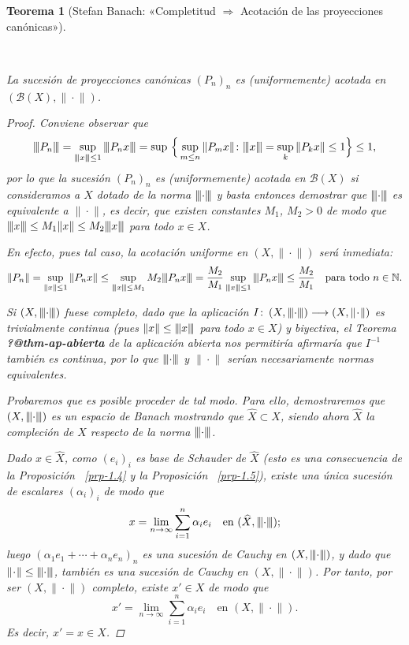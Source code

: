 \documentclass[
  spanish,
  letterpaper,
  DIV=11,
  numbers=noendperiod]{scrreprt}
\newtheorem{theorem}{Teorema}[chapter]
\theoremstyle{definition}
\theoremstyle{remark}
\theoremstyle{definition}
\theoremstyle{exampstyle}
\newcommand{\vertiii}[1]{{\left\vert\kern-0.25ex\left\vert\kern-0.25ex\left\vert #1 
    \right\vert\kern-0.25ex\right\vert\kern-0.25ex\right\vert}}
\newcommand{\vertiii}[1]{{\left\vert\kern-0.25ex\left\vert\kern-0.25ex\left\vert #1 
    \right\vert\kern-0.25ex\right\vert\kern-0.25ex\right\vert}}
\theoremstyle{plain}
\theoremstyle{plain}
\theoremstyle{definition}
\theoremstyle{plain}
\newtheorem{theorem}{Teorema}[chapter]
\theoremstyle{remark}
\begin{document}
\begin{theorem}[Stefan Banach: «Completitud \(\Longrightarrow\)
Acotación de las proyecciones
canónicas»]\protect\hypertarget{thm-banach}{}\label{thm-banach}

~

\hspace*{1mm}

La sucesión de proyecciones canónicas \((P_n)_n\) es (uniformemente)
acotada en \((\mathcal{B}(X),\|\!\cdot\!\|)\).

\begin{proof}
\leavevmode

\hspace*{1cm}

Conviene observar que \[
\vertiii{P_n}=\sup_{\vertiii{x} \leq 1}{\vertiii{P_nx}}=\sup\,\Big\{\sup_{m \leq n}\|P_mx\| \colon \vertiii{x} = \sup_{k}\| P_kx\| \leq 1\Big\} \leq 1,
\] por lo que la sucesión \((P_n)_n\) es (uniformemente) acotada en
\(\mathcal{B}(X)\) si consideramos a \(X\) dotado de la norma
\(\vertiii{\cdot}\) y basta entonces demostrar que \(\vertiii{\cdot}\)
es equivalente a \(\|\!\cdot\!\|\), es decir, que existen constantes
\(M_1\), \(M_2>0\) de modo que
\(\vertiii{x}\leq M_1\|x\|\leq M_2\vertiii{x}\) para todo \(x\in X\).

En efecto, pues tal caso, la acotación uniforme en \((X,\|\!\cdot\!\|)\)
será inmediata: \[
\|P_n\|=\sup_{\|x\|\leq 1}\|P_n x\|\leq\sup_{\vertiii{x}\leq M_1}M_2\vertiii{P_nx}=\dfrac{M_2}{M_1}\sup_{\vertiii{x}\leq 1}\vertiii{P_nx}\leq\dfrac{M_2}{M_1}\quad\text{para todo $n\in\mathbb{N}$}.
\]

Si \(\left(X,\vertiii{\cdot}\right)\) fuese completo, dado que la
aplicación
\(I \colon \left(X, \vertiii{\cdot}\right)\longrightarrow (X, \|\!\cdot\!\|)\)
es trivialmente continua (pues \(\|x\|\leq\vertiii{x}\) para todo
\(x\in X\)) y biyectiva, el Teorema \textbf{?@thm-ap-abierta} de la
aplicación abierta nos permitiría afirmaría que \(I^{-1}\) también es
continua, por lo que \(\vertiii{\cdot}\) y \(\|\!\cdot\!\|\) serían
necesariamente normas equivalentes.

Probaremos que es posible proceder de tal modo. Para ello, demostraremos
que \(\left(X,\vertiii{\cdot}\right)\) es un espacio de Banach mostrando
que \(\widehat{X}\subset X\), siendo ahora \(\widehat{X}\) la compleción
de \(X\) respecto de la norma \(\vertiii{\cdot}\).

Dado \(x\in\widehat{X}\), como \((e_i)_i\) es base de Schauder de
\(\widehat{X}\) (esto es una consecuencia de la Proposición
~\ref{prp-1.4} y la Proposición ~\ref{prp-1.5}), existe una única
sucesión de escalares \((\alpha_i)_i\) de modo que \[
x=\lim_{n\to\infty}\sum_{i=1}^n \alpha_i e_i\quad\text{en $(\widehat{X},\vertiii{\cdot})$;}
\] luego \((\alpha_1e_1+\cdots+\alpha_n e_n)_n\) es una sucesión de
Cauchy en \((X,\vertiii{\cdot})\), y dado que
\(\|\!\cdot\!\|\leq\vertiii{\cdot}\), también es una sucesión de Cauchy
en \((X,\|\!\cdot\!\|)\). Por tanto, por ser \((X,\|\!\cdot\!\|)\)
completo, existe \(x'\in X\) de modo que \[
x'=\lim_{n\to\infty}\sum_{i=1}^n \alpha_i e_i\quad\text{en $(X,\|\!\cdot\!\|)$.}
\] Es decir, \(x'=x\in X\).
\end{proof}


\end{theorem}
\end{document}
